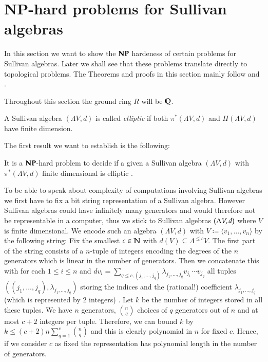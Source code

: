  \section{NP-hard problems for Sullivan algebras} \label{sec:NPSullivan}
 
 In this section we want to show the 
 $\mathbf{NP}$ hardeness of certain problems for Sullivan algebras. Later we shall see that these problems
 translate directly to topological problems. The Theorems and proofs in this section mainly follow  \cite{Lechuga2000} and
 \cite{Garvin2003}. 
 
 Throughout this section the ground ring $R$ will be $\mathbb{Q}$.


 \begin{Definition}
  A Sullivan algebra $(\Lambda V, d)$ is called \emph{elliptic} if both $\pi^*(\Lambda V,d)$ and $H(\Lambda V,d)$ have
  finite dimension.
 \end{Definition}
 
 The first result we want to establish is the following:
 
 \begin{Theorem}
 \label{thm:DecidingEllipticityIsNpHard}
  It is a $\mathbf{NP}$-hard problem to decide if a given a Sullivan algebra $(\Lambda V,d)$ with $\pi^*(\Lambda V,d)$ finite dimensional 
  is elliptic . 
 \end{Theorem}
 
 \begin{Remark}
 \label{rem:CodingOfSullivanAlgebras}
  To be able to speak about complexity of computations involving Sullivan algebras we first have to fix a bit string 
  representation of a Sullivan algebra. However Sullivan algebras could have infinitely many generators and would therefore
  not be representable in a computer, thus we stick to Sullivan algebras $(\Lambda V,d)$ where $V$ is finite dimensional. 
  We encode such an algebra $(\Lambda V, d)$ with $V \coloneqq \langle v_1, \ldots , v_n \rangle$
  by the following string: \newline
  Fix the smallest $c \in \mathbb{N}$ with $d(V) \subseteq \Lambda^{ \leq c} V$.
  The first part of the string consists of 
  a $n$-tuple of integers encoding the degrees of the $n$ generators which is linear in the number
  of generators. Then we concatenate this with  for each $ 1 \leq i \leq n$
  and $d v_i = \sum_{q \leq c, (j_1, \ldots, j_q)} \lambda_{j_1, \ldots, j_q} v_{j_1} \cdots v_{j_q}$ all tuples 
  $(({j_1, \ldots, j_q}), \lambda_{j_1, \ldots, j_q})$ storing the indices and the (rational!) coefficient 
  $\lambda_{j_1, \ldots, j_q}$ (which is represented by $2$ integers)
  . Let $k$ be the number of integers stored in all these tuples. We have $n$ generators,
  ${ n \choose q}$ choices of $q$ generators out of $n$ and at most $c + 2$ integers per tuple. Therefore, we can bound $k$ by
  $k \leq (c + 2)n \sum_{q = 1}^c { n \choose q} $ and this is clearly polynomial in $n$ for fixed $c$.
  Hence, if we consider $c$ as fixed the representation has polynomial length in the number
  of generators.
  
 \end{Remark}

